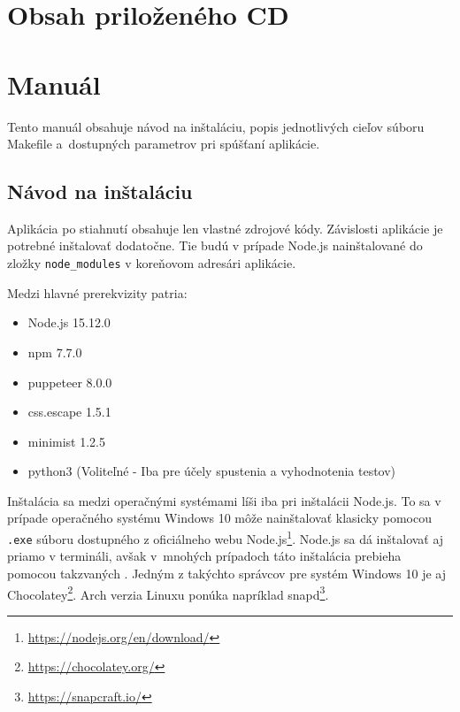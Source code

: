 \chapter{Obsah priloženého CD}


\chapter{Manuál}
\label{manual}

Tento manuál obsahuje návod na inštaláciu, popis jednotlivých cieľov súboru Makefile a~dostupných parametrov pri spúšťaní aplikácie.

\section{Návod na inštaláciu}

Aplikácia po stiahnutí obsahuje len vlastné zdrojové kódy. Závislosti aplikácie je potrebné inštalovať dodatočne. Tie budú v prípade Node.js nainštalované do zložky \texttt{node\_modules} v koreňovom adresári aplikácie.

Medzi hlavné prerekvizity patria:

\begin{itemize}
    \item Node.js 15.12.0
    \item npm 7.7.0
    \item puppeteer 8.0.0
    \item css.escape 1.5.1
    \item minimist 1.2.5
    \item python3 (Voliteľné - Iba pre účely spustenia a vyhodnotenia testov)
\end{itemize}

Inštalácia sa medzi operačnými systémami líši iba pri inštalácii Node.js. To sa v prípade operačného systému Windows 10 môže nainštalovať klasicky pomocou \texttt{.exe} súboru dostupného z oficiálneho webu Node.js\footnote{\url{https://nodejs.org/en/download/}}. Node.js sa dá inštalovať aj priamo v termináli, avšak v~mnohých prípadoch táto inštalácia prebieha pomocou takzvaných . Jedným z takýchto správcov pre systém Windows 10 je aj Chocolatey\footnote{\url{https://chocolatey.org/}}. Arch verzia Linuxu ponúka napríklad snapd\footnote{\url{https://snapcraft.io/}}. 

